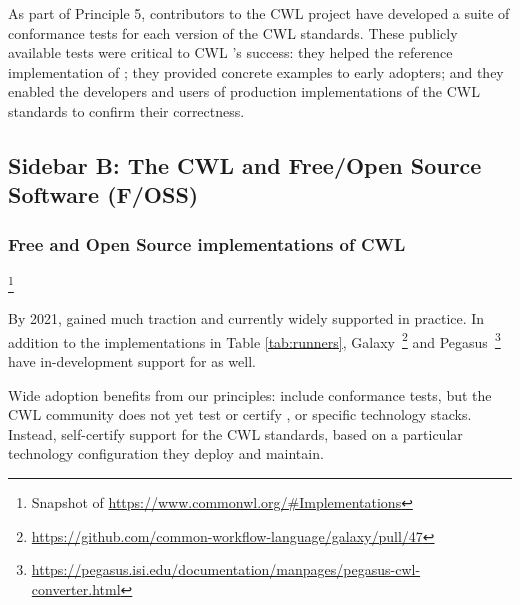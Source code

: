 \documentclass[sigconf,authordraft]{acmart}
\begin{document}
As part of Principle 5, contributors to the CWL project have developed a suite of conformance tests for each version of the CWL standards. These publicly available tests were critical to  CWL 's success: they helped  the reference implementation of ; they provided concrete examples to early adopters; and they enabled the developers and users of production implementations of the CWL standards to confirm their correctness.

\subsection{Sidebar B: The CWL  and Free/Open Source Software (F/OSS)}\label{sec:sidebar:b}

\subsubsection{Free and Open Source implementations of  CWL }\footnote{Snapshot of \url{https://www.commonwl.org/\#Implementations}}

By 2021,  gained much traction and  currently widely supported in practice. In addition to the implementations in Table \ref{tab:runners}, Galaxy~\cite{afgan_galaxy_2018}\footnote{\url{https://github.com/common-workflow-language/galaxy/pull/47}} and Pegasus~\cite{deelman_pegasus_2015}\footnote{\url{https://pegasus.isi.edu/documentation/manpages/pegasus-cwl-converter.html}} have in-development support for  as well.

Wide adoption benefits from our principles:  include conformance tests, but the CWL community does not yet test or certify , or specific technology stacks. Instead,  self-certify support for the CWL standards, based on a particular technology configuration they deploy and maintain.
\end{document}
